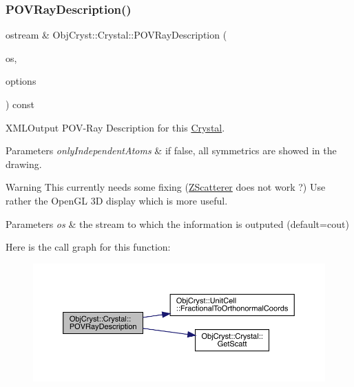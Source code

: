 \subsubsection{\texorpdfstring{POVRayDescription()}{POVRayDescription()}}
{\footnotesize\ttfamily ostream \& Obj\+Cryst\+::\+Crystal\+::\+P\+O\+V\+Ray\+Description (\begin{DoxyParamCaption}\item[{ostream \&}]{os,  }\item[{const \mbox{\hyperlink{struct_obj_cryst_1_1_crystal_p_o_v_ray_options}{Crystal\+P\+O\+V\+Ray\+Options}} \&}]{options }\end{DoxyParamCaption}) const}



X\+M\+L\+Output P\+O\+V-\/\+Ray Description for this \mbox{\hyperlink{class_obj_cryst_1_1_crystal}{Crystal}}. 


\begin{DoxyParams}{Parameters}
{\em only\+Independent\+Atoms} & if false, all symmetrics are showed in the drawing.\\
\hline
\end{DoxyParams}
\begin{DoxyWarning}{Warning}
This currently needs some fixing (\mbox{\hyperlink{class_obj_cryst_1_1_z_scatterer}{Z\+Scatterer}} does not work ?) Use rather the Open\+GL 3D display which is more useful.
\end{DoxyWarning}

\begin{DoxyParams}{Parameters}
{\em os} & the stream to which the information is outputed (default=cout) \\
\hline
\end{DoxyParams}
Here is the call graph for this function\+:
\nopagebreak
\begin{figure}[H]
\begin{center}
\leavevmode
\includegraphics[width=350pt]{class_obj_cryst_1_1_crystal_a1cdcbdf36f1a93e86d8e56270ac817ad_cgraph}
\end{center}
\end{figure}
\mbox{\label{class_obj_cryst_1_1_crystal_a086f39272ca94c23ff7819151a9edf37}} 
